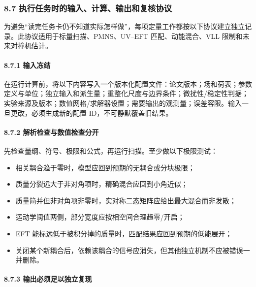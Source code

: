 \documentclass[
  chinese,
  UTF8]{ctexart}
\providecommand{\tightlist}{%
  \setlength{\itemsep}{0pt}\setlength{\parskip}{0pt}}
\begin{document}
\subsubsection{8.7
执行任务时的输入、计算、输出和复核协议}\label{ux6267ux884cux4efbux52a1ux65f6ux7684ux8f93ux5165ux8ba1ux7b97ux8f93ux51faux548cux590dux6838ux534fux8bae}

为避免``读完任务卡仍不知道实际怎样做''，每项定量工作都按以下协议建立独立记录。此协议适用于标量扫描、PMNS、UV--EFT
匹配、动能混合、VLL 限制和未来对撞机估计。

\paragraph{8.7.1 输入冻结}\label{ux8f93ux5165ux51bbux7ed3}

在运行计算前，将以下内容写入一个版本化配置文件：论文版本；场和荷表；参数定义与单位；独立输入和派生量；重整化尺度与边界条件；微扰性/稳定性判据；实验来源及版本；数值网格/求解器设置；需要输出的观测量；误差容限。输入一旦更改，必须生成新的配置
ID，不可静默覆盖旧结果。

\paragraph{8.7.2
解析检查与数值检查分开}\label{ux89e3ux6790ux68c0ux67e5ux4e0eux6570ux503cux68c0ux67e5ux5206ux5f00}

先检查量纲、符号、极限和公式，再运行扫描。至少做以下极限测试：

\begin{itemize}
\tightlist
\item
  相关耦合趋于零时，模型应回到预期的无耦合或分块极限；
\item
  质量分裂远大于非对角项时，精确混合应回到小角近似；
\item
  质量简并但非对角项非零时，实对称二态矩阵应给出最大混合而非发散；
\item
  运动学阈值两侧，部分宽度应按相空间合理趋零/开启；
\item
  EFT 能标远低于被积分掉的质量时，匹配结果应回到预期的低能展开；
\item
  关闭某个新耦合后，依赖该耦合的信号应消失，但其他独立机制不应被错误一并删除。
\end{itemize}

\paragraph{8.7.3
输出必须足以独立复现}\label{ux8f93ux51faux5fc5ux987bux8db3ux4ee5ux72ecux7acbux590dux73b0}
\end{document}

